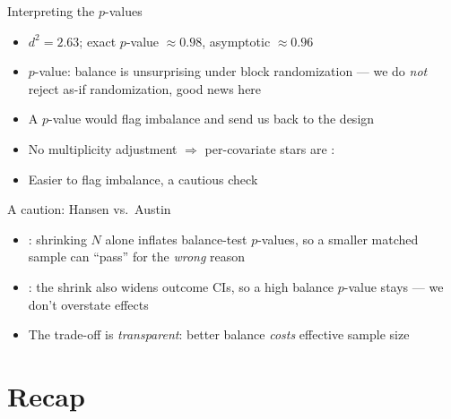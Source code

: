 \documentclass[table, xcolor = {dvipsnames}, 9pt]{beamer}
\theoremstyle{plain}
\newcommand{\mh}[1]{{\color{magenta}{#1}}}
\begin{document}
\begin{frame}[t]{Interpreting the $p$-values}
\vfill
\begin{itemize} \vfill
\item $d^2 = 2.63$; exact $p$-value $\approx 0.98$, asymptotic $\approx 0.96$ \vfill
\item \mh{Large} $p$-value: balance is unsurprising under block randomization --- we do \emph{not} reject as-if randomization, good news here \vfill
\item A \mh{small} $p$-value would flag imbalance and send us back to the design \vfill
\item No multiplicity adjustment $\Rightarrow$ per-covariate stars are \mh{conservative}: \vfill
\item[] Easier to flag imbalance, a cautious check \vfill
\end{itemize} \vfill
\end{frame}
\begin{frame}[t]{A caution: Hansen vs.\ Austin}
\vfill
\begin{itemize} \vfill
\item \mh{Austin's concern} \citep{austin2008,imaietal2008}: shrinking $N$ alone inflates balance-test $p$-values, so a smaller matched sample can ``pass'' for the \emph{wrong} reason \vfill
\item \mh{Hansen's reply} \citep{hansen2008b}: the shrink also widens outcome CIs, so a high balance $p$-value stays \mh{informative} --- we don't overstate effects \vfill
\item The trade-off is \emph{transparent}: better balance \emph{costs} effective sample size \vfill
\end{itemize} \vfill
\end{frame}
\section{Recap}
\end{document}
